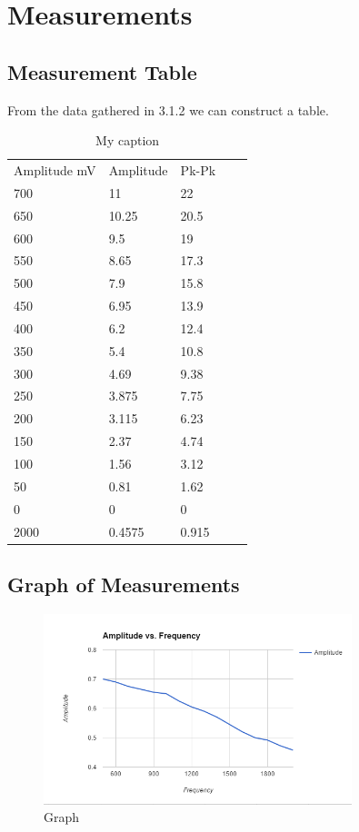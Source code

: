 \documentclass[12pt]{article}
\begin{document}
\section{Measurements}
\subsection{Measurement Table}

From the data gathered in 3.1.2 we can construct a table.
\begin{table}[]
	\centering
	\caption{My caption}
	\label{my-label}
	\begin{tabular}{lllll}
		Amplitude mV & Amplitude & Pk-Pk &  &  \\
		700          & 11        & 22    &  &  \\
		650          & 10.25     & 20.5  &  &  \\
		600          & 9.5       & 19    &  &  \\
		550          & 8.65      & 17.3  &  &  \\
		500          & 7.9       & 15.8  &  &  \\
		450          & 6.95      & 13.9  &  &  \\
		400          & 6.2       & 12.4  &  &  \\
		350          & 5.4       & 10.8  &  &  \\
		300          & 4.69      & 9.38  &  &  \\
		250          & 3.875     & 7.75  &  &  \\
		200          & 3.115     & 6.23  &  &  \\
		150          & 2.37      & 4.74  &  &  \\
		100          & 1.56      & 3.12  &  &  \\
		50           & 0.81      & 1.62  &  &  \\
		0            & 0         & 0     &  &  \\
		2000         & 0.4575    & 0.915 &  & 
	\end{tabular}
\end{table}
\newpage
\subsection{Graph of Measurements}	

\begin{figure}[h]
	\centering
	\includegraphics[width=0.8\textwidth]{graph.png}
	\caption{Graph}
	\label{fig:graph}
\end{figure}	
\end{document}
